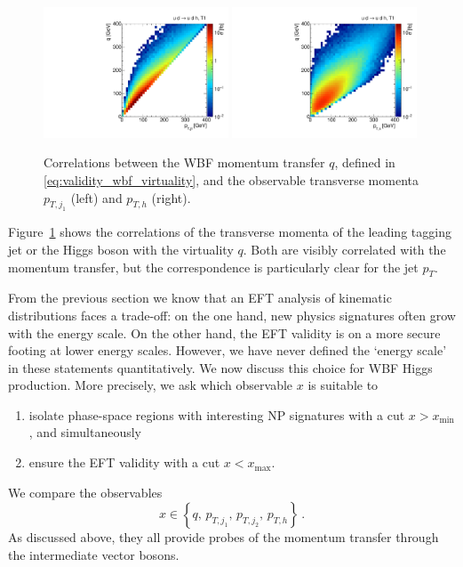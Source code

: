 \begin{figure}
  \includegraphics[width=0.49\textwidth]{fig/validity/WBF_correl_q_j1pt.pdf}%
  \includegraphics[width=0.49\textwidth]{fig/validity/WBF_correl_q_Hpt.pdf}%
  \caption{Correlations between the WBF momentum transfer $q$, defined
    in \autoref{eq:validity_wbf_virtuality}, and the observable
    transverse momenta $p_{T,j_1}$ (left) and $p_{T,h}$ (right).}
  \label{fig:validity_virtuality_correlations}
\end{figure}

Figure~\ref{fig:validity_virtuality_correlations} shows the
correlations of the transverse momenta of the leading tagging jet or
the Higgs boson with the virtuality $q$. Both are visibly correlated
with the momentum transfer, but the correspondence is particularly
clear for the jet $p_T$.

\newparagraph
%
From the previous section we know that an EFT analysis of kinematic
distributions faces a trade-off: on the one hand, new physics
signatures often grow with the energy scale. On the other hand, the
EFT validity is on a more secure footing at lower energy
scales. However, we have never defined the `energy scale' in these
statements quantitatively. We now discuss this choice for WBF Higgs
production. More precisely, we ask which observable $x$ is suitable to
%
\begin{enumerate}
\item isolate phase-space regions with interesting NP signatures with
  a cut $x > x_{\text{min}}$, and simultaneously
\item ensure the EFT validity with a cut $x < x_{\text{max}}$.
\end{enumerate}
%
We compare the observables
%
\begin{equation}
  x \in \left\{  q, \, p_{T,j_1}, \, p_{T,j_2}, \, p_{T,h} \right\} \,.
\end{equation}
%
As discussed above, they all provide probes of the momentum transfer
through the intermediate vector bosons. 

